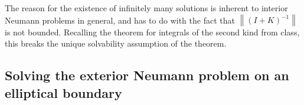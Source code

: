 \documentclass[11pt]{article}
\newcommand{\norm}[1]{\left\lVert#1\right\rVert}
\begin{document}
The reason for the existence of infinitely many solutions is inherent to interior Neumann problems in general, and has to do with the fact that $\norm{(I+K)^{-1}}$ is not bounded. Recalling the theorem for integrals of the second kind from class, this breaks the unique solvability assumption of the theorem.

\subsection{Solving the exterior Neumann problem on an elliptical boundary}
\end{document}
